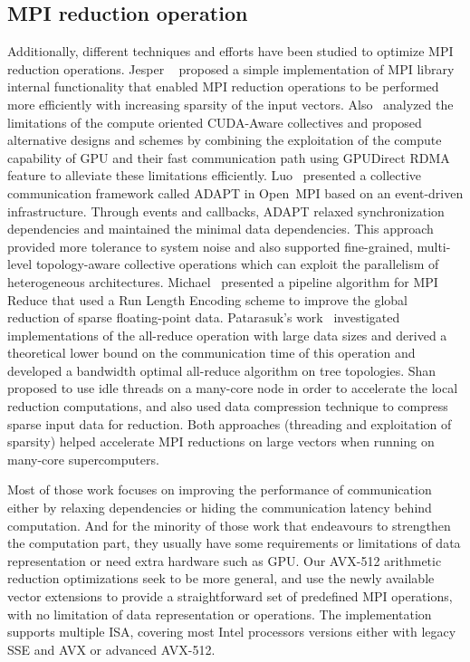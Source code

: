 \documentclass[sigconf]{acmart}
\newcommand{\ompi}[0]{Open~MPI\xspace}
\newcommand{\mpi}[0]{\textsc{MPI}\xspace}
\begin{document}
\subsection{\mpi reduction operation}
Additionally, different techniques and
efforts have been studied to optimize \mpi reduction operations. Jesper
~\cite{Neutral_MPI_Reduction} proposed a simple implementation of MPI library
internal functionality that enabled MPI reduction operations to be performed
more efficiently with increasing sparsity of the input vectors.
%
Also~\cite{gpu-reduce} analyzed the limitations of the compute oriented CUDA-Aware
collectives and proposed alternative designs and schemes by combining the exploitation of the
compute capability of GPU and their fast communication
path using GPUDirect RDMA feature to alleviate these limitations efficiently.
%
Luo~\cite{Luo-adapt} presented a collective communication framework called ADAPT
in \ompi based on an event-driven infrastructure. Through events and callbacks,
ADAPT relaxed synchronization dependencies and maintained the minimal data dependencies.
This approach provided more tolerance to system noise and also supported fine-grained,
multi-level topology-aware collective operations which can exploit the
parallelism of heterogeneous architectures.
%
Michael~\cite{sparse-reduction} presented a pipeline algorithm for MPI Reduce
that used a Run Length Encoding scheme to improve the global reduction of sparse
floating-point data.
Patarasuk's work~\cite{allreduce-optimal} investigated implementations of the all-reduce operation
with large data sizes and derived a theoretical lower bound on the communication time of this operation and developed
a bandwidth optimal all-reduce algorithm on tree topologies.
%
Shan~\cite{shan-reduce} proposed to use idle threads on a many-core node in order to accelerate
the local reduction computations, and also used data compression technique to compress sparse input data for reduction.
Both approaches (threading and exploitation
of sparsity) helped accelerate MPI reductions on large vectors when
running on many-core supercomputers.
%

Most of those work focuses on improving the performance of
communication either by relaxing dependencies or hiding the communication latency behind computation.
And for the minority of those work that endeavours to strengthen the computation part,
they usually have some requirements or limitations of data
representation or need extra hardware such as GPU.
Our AVX-512 arithmetic reduction
optimizations seek to be more general, and use the newly available vector extensions to provide a
straightforward set of predefined MPI operations, with no limitation of data representation or operations.
The implementation supports multiple ISA, covering most Intel processors versions   either with legacy SSE and AVX or advanced AVX-512.
\end{document}
